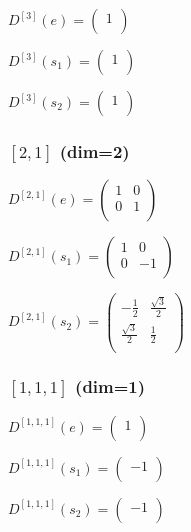 \documentclass{article}
\begin{document}
$D^{[3]}(e) = \begin{pmatrix}
  1 \\
\end{pmatrix}$

$D^{[3]}(s_1) = \begin{pmatrix}
  1 \\
\end{pmatrix}$

$D^{[3]}(s_2) = \begin{pmatrix}
  1 \\
\end{pmatrix}$

\subsubsection*{$[2,1]$ (dim=2)}

$D^{[2,1]}(e) = \begin{pmatrix}
  1 & 0 \\
  0 & 1 \\
\end{pmatrix}$

$D^{[2,1]}(s_1) = \begin{pmatrix}
  1 & 0 \\
  0 & -1 \\
\end{pmatrix}$

$D^{[2,1]}(s_2) = \begin{pmatrix}
  -\frac{1}{2} & \frac{\sqrt{3}}{2} \\
  \frac{\sqrt{3}}{2} & \frac{1}{2} \\
\end{pmatrix}$

\subsubsection*{$[1,1,1]$ (dim=1)}

$D^{[1,1,1]}(e) = \begin{pmatrix}
  1 \\
\end{pmatrix}$

$D^{[1,1,1]}(s_1) = \begin{pmatrix}
  -1 \\
\end{pmatrix}$

$D^{[1,1,1]}(s_2) = \begin{pmatrix}
  -1 \\
\end{pmatrix}$
\end{document}
